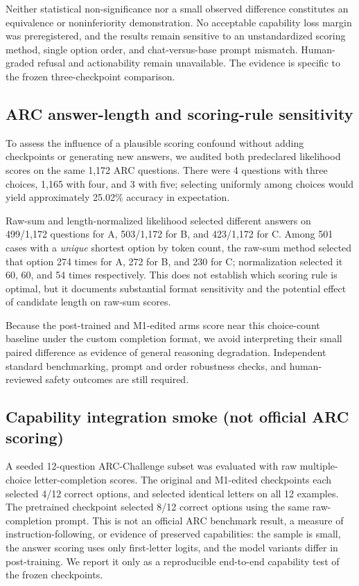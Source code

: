 \documentclass[11pt]{article}
\begin{document}
Neither statistical non-significance nor a small observed
difference constitutes an equivalence or noninferiority
demonstration. No acceptable capability loss margin was
preregistered, and the results remain sensitive to an
unstandardized scoring method, single option order, and
chat-versus-base prompt mismatch. Human-graded refusal
and actionability remain unavailable. The evidence is
specific to the frozen three-checkpoint comparison.

\subsection{ARC answer-length and scoring-rule sensitivity}
To assess the influence of a plausible scoring confound without
adding checkpoints or generating new answers, we audited both
predeclared likelihood scores on the same 1,172 ARC questions.
There were 4 questions with three choices, 1,165 with four,
and 3 with five; selecting uniformly among choices would
yield approximately 25.02\% accuracy in expectation.

Raw-sum and length-normalized likelihood selected different
answers on 499/1,172 questions for A, 503/1,172 for B,
and 423/1,172 for C. Among 501 cases with a \emph{unique}
shortest option by token count, the raw-sum method selected
that option 274 times for A, 272 for B, and 230 for C;
normalization selected it 60, 60, and 54 times respectively.
This does not establish which scoring rule is optimal, but
it documents substantial format sensitivity and the potential
effect of candidate length on raw-sum scores.

Because the post-trained and M1-edited arms score near this
choice-count baseline under the custom completion format, we
avoid interpreting their small paired difference as evidence
of general reasoning degradation. Independent standard
benchmarking, prompt and order robustness checks, and
human-reviewed safety outcomes are still required.

\subsection{Capability integration smoke (not official ARC scoring)}
A seeded 12-question ARC-Challenge subset was evaluated with raw
multiple-choice letter-completion scores. The original and M1-edited
checkpoints each selected 4/12 correct options, and selected identical
letters on all 12 examples. The pretrained checkpoint selected 8/12
correct options using the same raw-completion prompt. This is not
an official ARC benchmark result, a measure of instruction-following,
or evidence of preserved capabilities: the sample is small, the answer
scoring uses only first-letter logits, and the model variants differ
in post-training. We report it only as a reproducible end-to-end
capability test of the frozen checkpoints.
\end{document}
